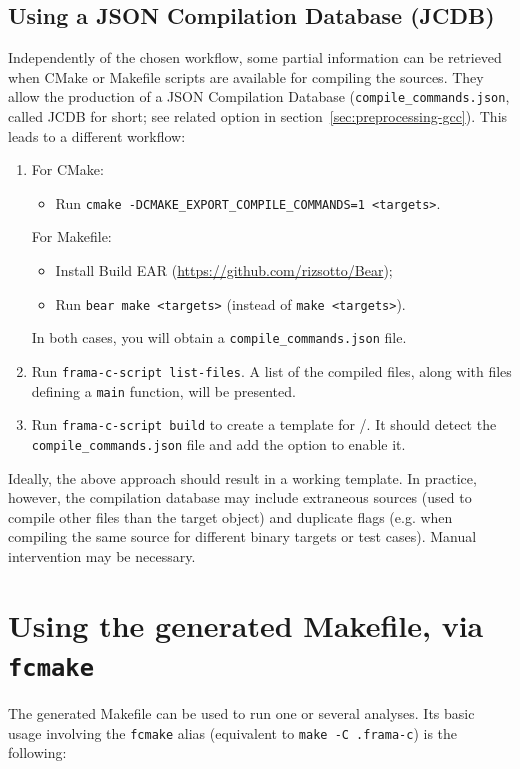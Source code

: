 \subsection{Using a JSON Compilation Database (JCDB)}
\label{sec:using-json-comp}
Independently of the chosen workflow, some partial information can be retrieved
when CMake or Makefile scripts are available for compiling the sources.
They allow the production of a JSON Compilation Database
(\texttt{compile\_commands.json}, called JCDB for short; see related option
in section~\ref{sec:preprocessing-gcc}). This leads to a different workflow:

\begin{enumerate}
\item For CMake:
  \begin{itemize}
  \item Run \texttt{cmake -DCMAKE\_EXPORT\_COMPILE\_COMMANDS=1 <targets>}.
  \end{itemize}
  For Makefile:
  \begin{itemize}
  \item Install Build EAR (\url{https://github.com/rizsotto/Bear});
  \item Run \texttt{bear~make~<targets>} (instead of \texttt{make <targets>}).
  \end{itemize}
  In both cases, you will obtain a \texttt{compile\_commands.json} file.
\item Run \texttt{frama-c-script list-files}. A list of the compiled files,
  along with files defining a \texttt{main} function, will be presented.
\item Run \texttt{frama-c-script build} to create a template for
  \FramaC/\Value. It should detect the \texttt{compile\_commands.json} file
  and add the option to enable it.
\end{enumerate}

Ideally, the above approach should result in a working template. In practice,
however, the compilation database may include extraneous sources
(used to compile other files than the target object) and duplicate flags
(e.g. when compiling the same source for different binary targets or test
cases). Manual intervention may be necessary.

\section{Using the generated Makefile, via \texttt{fcmake}}
\label{sec:using-generated-makefile}

The generated Makefile can be used to run one or several analyses.
Its basic usage involving the \texttt{fcmake} alias (equivalent to
\texttt{make -C .frama-c}) is the following:

